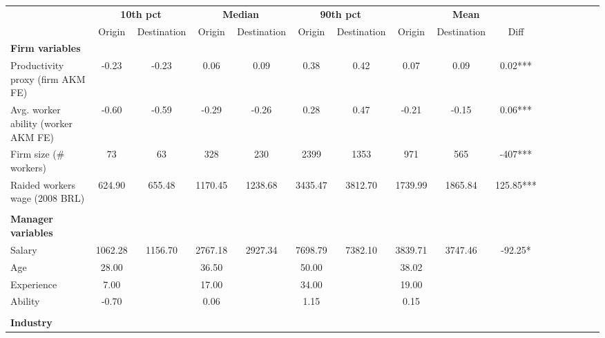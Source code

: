 {
\def\sym#1{\ifmmode^{#1}\else\(^{#1}\)\fi}
\begin{tabular}{l*{5}{ccc}}
\toprule
                    &\multicolumn{2}{c}{\textbf{10th pct}}&\multicolumn{2}{c}{\textbf{Median}}&\multicolumn{2}{c}{\textbf{90th pct}}&\multicolumn{3}{c}{\textbf{Mean}}        \\\cmidrule(lr){2-3}\cmidrule(lr){4-5}\cmidrule(lr){6-7}\cmidrule(lr){8-10}
                    &      Origin& Destination&      Origin& Destination&      Origin& Destination&      Origin& Destination&        Diff   \\
\midrule
\textbf{Firm variables}&            &            &            &            &            &            &            &            &               \\
Productivity proxy (firm AKM FE)&       -0.23&       -0.23&        0.06&        0.09&        0.38&        0.42&        0.07&        0.09&        0.02***\\
Avg. worker ability (worker AKM FE)&       -0.60&       -0.59&       -0.29&       -0.26&        0.28&        0.47&       -0.21&       -0.15&        0.06***\\
Firm size (\# workers)&          73&          63&         328&         230&        2399&        1353&         971&         565&        -407***\\
Raided workers wage (2008 BRL)&      624.90&      655.48&     1170.45&     1238.68&     3435.47&     3812.70&     1739.99&     1865.84&      125.85***\\
\\ \textbf{Manager variables}&            &            &            &            &            &            &            &            &               \\
Salary              &     1062.28&     1156.70&     2767.18&     2927.34&     7698.79&     7382.10&     3839.71&     3747.46&      -92.25*  \\
Age                 &       28.00&            &       36.50&            &       50.00&            &       38.02&            &               \\
Experience          &        7.00&            &       17.00&            &       34.00&            &       19.00&            &               \\
Ability             &       -0.70&            &        0.06&            &        1.15&            &        0.15&            &               \\
\\ \textbf{Industry}&            &            &            &            &            &            &            &            &               \\

\end{tabular}}
